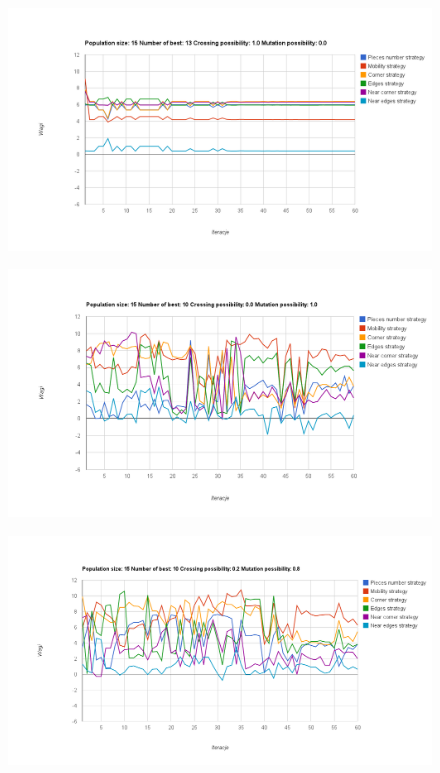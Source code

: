 \begin{figure}[h!]
\centering
\includegraphics[width=\textwidth]{img/chart16.png}
\end{figure}

\pagebreak

\begin{figure}[h!]
\centering
\includegraphics[width=\textwidth]{img/chart11.png}
\end{figure}

\begin{figure}[h!]
\centering
\includegraphics[width=\textwidth]{img/chart12.png}
\end{figure}

